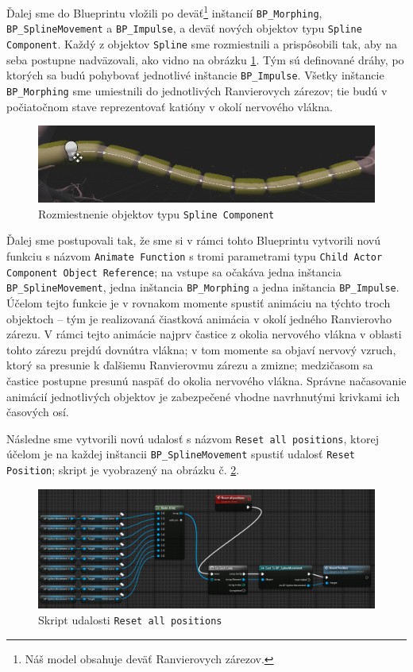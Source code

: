 Ďalej sme do Blueprintu vložili po deväť\footnote{Náš model obsahuje deväť Ranvierovych zárezov.} inštancií \texttt{BP\_Morphing}, \texttt{BP\_SplineMovement} a \texttt{BP\_Impulse}, a deväť nových objektov typu 
\texttt{Spline Component}.
Každý z objektov \texttt{Spline} sme rozmiestnili a prispôsobili tak, aby na seba postupne nadväzovali, ako vidno na obrázku \ref{splines}. Tým sú definované dráhy, po ktorých sa budú pohybovať jednotlivé inštancie 
\texttt{BP\_Impulse}. Všetky inštancie \texttt{BP\_Morphing} sme umiestnili do jednotlivých Ranvierovych zárezov; tie budú v počiatočnom stave reprezentovať katióny v okolí nervového vlákna. 

\begin{figure}[!htbp]
  \centering
  \includegraphics[width=15cm]{img/splines.png}
  \caption{Rozmiestnenie objektov typu \texttt{Spline Component}}
  \label{splines}
\end{figure}

Ďalej sme postupovali tak, že sme si v rámci tohto Blueprintu vytvorili novú funkciu s názvom \texttt{Animate Function} s tromi parametrami typu \texttt{Child Actor Component Object Reference}; na vstupe sa očakáva jedna inštancia
\texttt{BP\_SplineMovement}, jedna inštancia \texttt{BP\_Morphing} a jedna inštancia \texttt{BP\_Impulse}. Účelom tejto funkcie je v rovnakom momente spustiť animáciu na týchto troch objektoch {--} tým je realizovaná čiastková animácia
v okolí jedného Ranvierovho zárezu. V rámci tejto animácie najprv častice z okolia nervového vlákna v oblasti tohto zárezu prejdú dovnútra vlákna; v tom momente sa objaví nervový vzruch, ktorý sa presunie k ďalšiemu Ranvierovmu
zárezu a zmizne; medzičasom sa častice postupne presunú naspäť do okolia nervového vlákna. Správne načasovanie animácií jednotlivých objektov je zabezpečené vhodne navrhnutými krivkami ich časových osí.

Následne sme vytvorili novú udalosť s názvom \texttt{Reset all positions}, ktorej účelom je na každej inštancii \texttt{BP\_SplineMovement} spustiť udalosť \texttt{Reset Position}; skript je vyobrazený na obrázku č. \ref{resetall}.

\begin{figure}[!htbp]
  \centering
  \includegraphics[width=15cm]{img/resetall.png}
  \caption{Skript udalosti \texttt{Reset all positions}}
  \label{resetall}
\end{figure}

